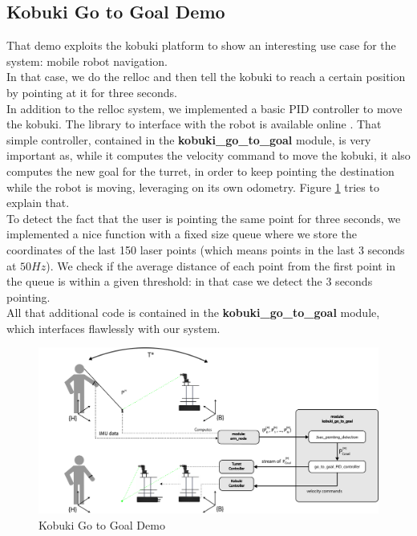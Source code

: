 \subsection{Kobuki Go to Goal Demo}\label{subs:kobukiGoToGoal}
That demo exploits the kobuki platform to show an interesting use case for the system: mobile robot navigation.\\
In that case, we do the relloc and then tell the kobuki to reach a certain position by pointing at it for three seconds.\\
In addition to the relloc system, we implemented a basic PID controller to move the kobuki. The library to interface with the robot is available online \cite{kobuki:ROS}. That simple controller, contained in the \textbf{kobuki\_go\_to\_goal} module, is very important as, while it computes the velocity command to move the kobuki, it also computes the new goal for the turret, in order to keep pointing the destination while the robot is moving, leveraging on its own odometry. Figure \ref{fig:goToGoalDemo} tries to explain that.\\ 
To detect the fact that the user is pointing the same point for three seconds, we implemented a nice function with a fixed size queue where we store the coordinates of the last 150 laser points (which means points in the last $3$ seconds at $50Hz$). We check if the average distance of each point from the first point in the queue is within a given threshold: in that case we detect the 3 seconds pointing.\\
All that additional code is contained in the \textbf{kobuki\_go\_to\_goal} module, which interfaces flawlessly with our system.
\begin{figure}
	\centering
	\includegraphics[width=\textwidth]{img/kgtgSW.png}%
	\caption{Kobuki Go to Goal Demo}
	\label{fig:goToGoalDemo}
\end{figure}
